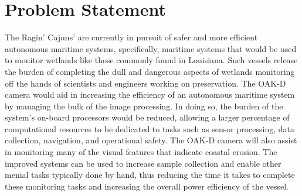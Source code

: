 \documentclass[letterpaper, 12 pt, conference]{ieeeconf}
\begin{document}
\section{Problem Statement}
The Ragin’ Cajuns' are currently in pursuit of safer and more efficient autonomous maritime systems, specifically, maritime systems that would be used to monitor wetlands like those commonly found in Louisiana. Such vessels release the burden of completing the dull and dangerous aspects of wetlands monitoring off the hands of scientists and engineers working on preservation. The OAK-D camera would aid in increasing the efficiency of an autonomous maritime system by managing the bulk of the image processing. In doing so, the burden of the system's on-board processors would be reduced, allowing a larger percentage of computational resources to be dedicated to tasks such as sensor processing, data collection, navigation, and operational safety. The OAK-D camera will also assist in monitoring many of the visual features that indicate coastal erosion. The improved systems can be used to increase sample collection and enable other menial tasks typically done by hand, thus reducing the time it takes to complete these monitoring tasks and increasing the overall power efficiency of the vessel. 
\end{document}
